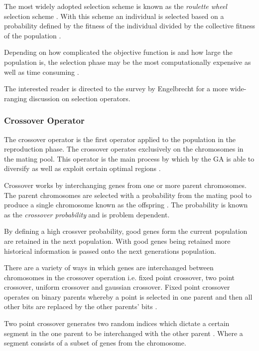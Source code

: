 The most widely adopted selection scheme is known as the \emph{roulette wheel} selection scheme \cite{ConstrainedGA,GeostatisticalGA,HybridBaldwinGA,CoactiveFuzzyGA}. With this scheme an individual is selected based on a probability defined by the fitness of the individual divided by the collective fitness of the population \cite{GeostatisticalGA}.

Depending on how complicated the objective function is and how large the population is, the selection phase may be the most computationally expensive as well as time consuming \cite{AcceleratingGA}.

The interested reader is directed to the survey by Engelbrecht\cite{CompuIntelligenceIntro} for a more wide-ranging discussion on selection operators.

\subsubsection{Crossover Operator}
\label{sec:crossover}
The crossover operator is the first operator applied to the population in the reproduction phase. The crossover operates exclusively on the chromosomes in the mating pool. This operator is the main process by which by the GA is able to diversify as well as exploit certain optimal regions \cite{CombinedBranchBoundGA,CoactiveFuzzyGA}. 

Crossover works by interchanging genes from one or more parent chromosomes. The parent chromosomes are selected with a probability from the mating pool to produce a single chromosome known as the offspring \cite{FamilyGA,HumanPassiveGA,CoactiveFuzzyGA}. The probability is known as the \emph{crossover probability} and is problem dependent\cite{CompuIntelligenceIntro}.

By defining a high crossver probability, good genes form the current population are retained in the next population\cite{CompuIntelligenceIntro}. With good genes being retained more historical information is passed onto the next generations population\cite{FamilyGA}.

There are a variety of ways in which genes are interchanged between chromosomes in the crossover operation i.e. fixed point crossover, two point crossover, uniform crossover and gaussian crossover\cite{CompuIntelligenceIntro}. Fixed point crossover operates on binary parents whereby a point is selected in one parent and then all other bits are replaced by the other parents' bits \cite{HumanPassiveGA}. 

Two point crossover generates two random indices which dictate a certain segment in the one parent to be interchanged with the other parent \cite{ConstrainedGA}. Where a segment consists of a subset of genes from the chromosome. 

